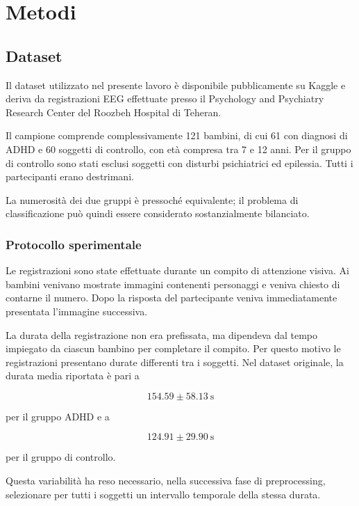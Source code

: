 \section{Metodi}

\subsection{Dataset}

Il dataset utilizzato nel presente lavoro è disponibile pubblicamente
su Kaggle \cite{Kaggle} e deriva da registrazioni EEG effettuate
presso il Psychology and Psychiatry Research Center del Roozbeh
Hospital di Teheran.

Il campione comprende complessivamente 121 bambini, di cui 61 con
diagnosi di ADHD e 60 soggetti di controllo, con età compresa tra
7 e 12 anni. Per il gruppo di controllo sono stati esclusi soggetti con disturbi psichiatrici ed epilessia. Tutti i partecipanti erano destrimani.

La numerosità dei due gruppi è pressoché equivalente; il problema di
classificazione può quindi essere considerato sostanzialmente
bilanciato.


\subsubsection{Protocollo sperimentale}

Le registrazioni sono state effettuate durante un compito di
attenzione visiva. Ai bambini venivano mostrate immagini contenenti
personaggi e veniva chiesto di contarne il numero. Dopo la risposta
del partecipante veniva immediatamente presentata l'immagine
successiva.

La durata della registrazione non era prefissata, ma dipendeva dal
tempo impiegato da ciascun bambino per completare il compito. Per
questo motivo le registrazioni presentano durate differenti tra i
soggetti. Nel dataset originale, la durata media riportata è pari a

\begin{equation}
	154.59 \pm 58.13 \ \text{s}
\end{equation}

per il gruppo ADHD e a

\begin{equation}
	124.91 \pm 29.90 \ \text{s}
\end{equation}

per il gruppo di controllo.

Questa variabilità ha reso necessario, nella successiva fase di
preprocessing, selezionare per tutti i soggetti un intervallo
temporale della stessa durata.


